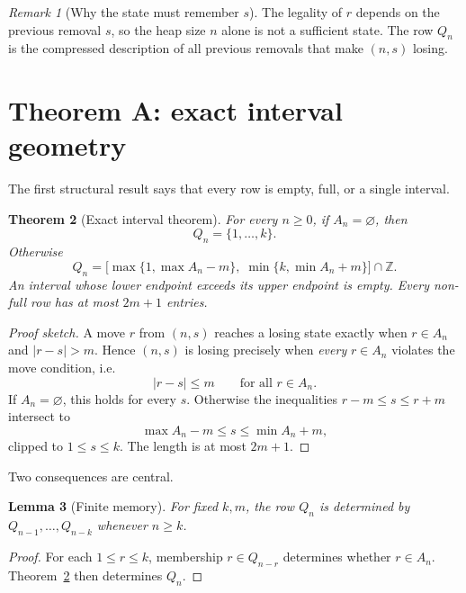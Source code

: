\documentclass[11pt]{article}
\newtheorem{theorem}{Theorem}[section]
\newtheorem{lemma}[theorem]{Lemma}
\theoremstyle{remark}
\newtheorem{remark}[theorem]{Remark}
\begin{document}
\begin{remark}[Why the state must remember \(s\)]
The legality of \(r\) depends on the previous removal \(s\), so the heap size \(n\) alone is not a sufficient state. The row \(Q_n\) is the compressed description of all previous removals that make \((n,s)\) losing.
\end{remark}

\section{Theorem A: exact interval geometry}\label{sec:A}

The first structural result says that every row is empty, full, or a single interval.

\begin{theorem}[Exact interval theorem]\label{thm:A}
For every \(n\ge0\), if \(A_n=\varnothing\), then
\begin{equation}\label{eq:Afull}
Q_n=\{1,\dots,k\}.
\end{equation}
Otherwise
\begin{equation}\label{eq:Ainterval}
\boxed{
Q_n=
\bigl[\max\{1,\max A_n-m\},\;
\min\{k,\min A_n+m\}\bigr]\cap\mathbb Z.
}
\end{equation}
An interval whose lower endpoint exceeds its upper endpoint is empty. Every non-full row has at most \(2m+1\) entries.
\end{theorem}

\begin{proof}[Proof sketch]
A move \(r\) from \((n,s)\) reaches a losing state exactly when \(r\in A_n\) and \(|r-s|>m\). Hence \((n,s)\) is losing precisely when \emph{every} \(r\in A_n\) violates the move condition, i.e.
\[
|r-s|\le m
\qquad\text{for all }r\in A_n.
\]
If \(A_n=\varnothing\), this holds for every \(s\). Otherwise the inequalities \(r-m\le s\le r+m\) intersect to
\[
\max A_n-m\le s\le \min A_n+m,
\]
clipped to \(1\le s\le k\). The length is at most \(2m+1\).
\end{proof}

Two consequences are central.

\begin{lemma}[Finite memory]\label{lem:memory}
For fixed \(k,m\), the row \(Q_n\) is determined by \(Q_{n-1},\dots,Q_{n-k}\) whenever \(n\ge k\).
\end{lemma}

\begin{proof}
For each \(1\le r\le k\), membership \(r\in Q_{n-r}\) determines whether \(r\in A_n\). Theorem~\ref{thm:A} then determines \(Q_n\).
\end{proof}
\end{document}
